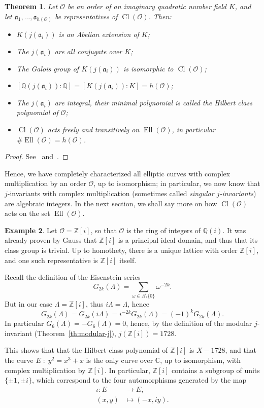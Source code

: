 \documentclass[10pt]{article}
\theoremstyle{plain}
\newtheorem{theorem}{Theorem}
\theoremstyle{definition}
\newtheorem{example}[theorem]{Example}
\DeclareMathOperator{\Cl}{Cl}
\DeclareMathOperator{\Ell}{Ell}
\def\O{\ensuremath{\mathcal{O}}}
\def\a{\ensuremath{\mathfrak{a}}}
\begin{document}
\begin{prposition}
\begin{theorem}
  \label{th:compl-mult}
  Let $\O$ be an order of an imaginary quadratic
  number field $K$, and let
  $\a_1,\dots,\a_{h(\O)}$ be representatives of $\Cl(\O)$. %
  Then:
  \begin{itemize}
  \item $K(j(\a_i))$ is an Abelian extension of $K$;
  \item The $j(\a_i)$ are all conjugate over $K$;
  \item The Galois group of $K(j(\a_i))$ is isomorphic to $\Cl(\O)$;
  \item $[ℚ(j(\a_i)):ℚ] = [K(j(\a_i)):K] = h(\O)$;
  \item The $j(\a_i)$ are integral, their minimal polynomial is called
    the \emph{Hilbert class polynomial} of $\O$;
  \item $\Cl(\O)$ acts freely and transitively on $\Ell(\O)$, in
    particular $\#\Ell(\O) = h(\O)$.
  \end{itemize}
\end{theorem}
\begin{proof}
  See~\cite[Ch.~II]{silverman:advanced} and~\cite[Ch.~10]{lang1987elliptic}.
\end{proof}

Hence, we have completely characterized all elliptic curves with
complex multiplication by an order $\O$, up to isomorphism; in
particular, we now know that $j$-invariants with complex
multiplication (sometimes called \emph{singular $j$-invariants}) are
algebraic integers. %
In the next section, we shall say more on how $\Cl(\O)$ acts on the set
$\Ell(\O)$.

\begin{example}
  Let $\O=ℤ[i]$, so that $\O$ is the ring of integers of $ℚ(i)$. %
  It was already proven by Gauss that $ℤ[i]$ is a principal ideal
  domain, and thus that its class group is trivial. %
  Up to homothety, there is a unique lattice with order $ℤ[i]$, and
  one such representative is $ℤ[i]$ itself.

  Recall the definition of the Eisenstein series
  \[G_{2k}(Λ) = \sum_{ω∈Λ\setminus\{0\}} ω^{-2k}.\]
  But in our case $Λ=ℤ[i]$, thus $iΛ=Λ$, hence
  \[G_{2k}(Λ) = G_{2k}(iΛ) = i^{-2k}G_{2k}(Λ) = (-1)^kG_{2k}(Λ).\] In
  particular $G_6(Λ) = - G_6(Λ) = 0$, hence, by the definition of the
  modular $j$-invariant (Theorem~\ref{th:modular-j}),
  $j(ℤ[i]) = 1728$.

  This shows that that the Hilbert class polynomial of $ℤ[i]$ is
  $X-1728$, and that the curve $E\;:\;y^2=x^3+x$ is the only curve
  over $ℂ$, up to isomorphism, with complex multiplication by
  $ℤ[i]$. %
  In particular, $ℤ[i]$ contains a subgroup of units $\{±1,±i\}$,
  which correspond to the four automorphisms generated by the map
  \begin{align*}
    ι : E &→ E,\\
    (x,y) &↦ (-x,iy).
  \end{align*}
\end{example}



\end{prposition}
\end{document}
